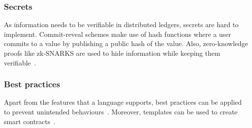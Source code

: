 \subsubsection{Secrets}
As information needs to be verifiable in distributed ledgers, secrets are hard to implement. Commit-reveal schemes make use of hash functions where a user commits to a value by publishing a public hash of the value. Also, zero-knowledge proofs like zk-SNARKS are used to hide information while keeping them verifiable~\cite{Sasson2014}.

\subsubsection{Best practices}
Apart from the features that a language supports, best practices can be applied to prevent unintended behaviours~\cite{Wohrer2018,ConsenSys2018Security}.
Moreover, templates can be used to create smart contracts~\cite{Clack2016}.

